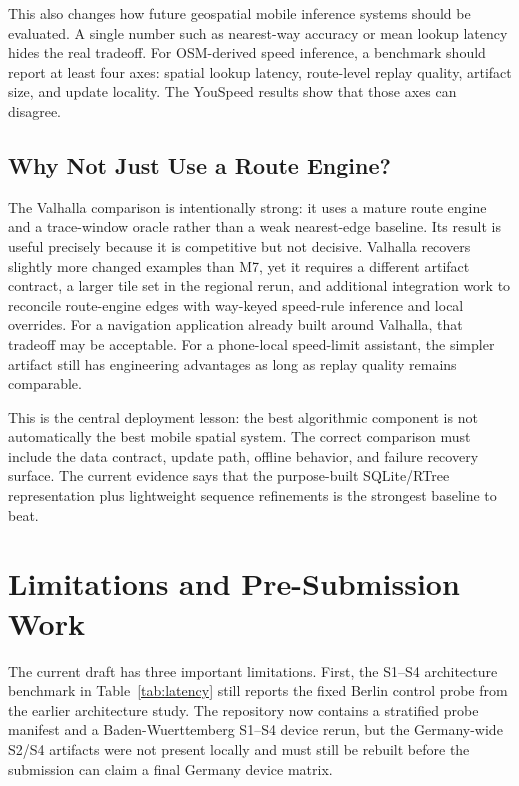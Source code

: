 \documentclass[sigconf]{acmart}
\begin{document}
This also changes how future geospatial mobile inference systems should be evaluated. A single number such as nearest-way accuracy or mean lookup latency hides the real tradeoff. For OSM-derived speed inference, a benchmark should report at least four axes: spatial lookup latency, route-level replay quality, artifact size, and update locality. The YouSpeed results show that those axes can disagree.

\subsection{Why Not Just Use a Route Engine?}

The Valhalla comparison is intentionally strong: it uses a mature route engine and a trace-window oracle rather than a weak nearest-edge baseline. Its result is useful precisely because it is competitive but not decisive. Valhalla recovers slightly more changed examples than M7, yet it requires a different artifact contract, a larger tile set in the regional rerun, and additional integration work to reconcile route-engine edges with way-keyed speed-rule inference and local overrides. For a navigation application already built around Valhalla, that tradeoff may be acceptable. For a phone-local speed-limit assistant, the simpler artifact still has engineering advantages as long as replay quality remains comparable.

This is the central deployment lesson: the best algorithmic component is not automatically the best mobile spatial system. The correct comparison must include the data contract, update path, offline behavior, and failure recovery surface. The current evidence says that the purpose-built SQLite/RTree representation plus lightweight sequence refinements is the strongest baseline to beat.

\section{Limitations and Pre-Submission Work}

The current draft has three important limitations. First, the S1--S4 architecture benchmark in Table~\ref{tab:latency} still reports the fixed Berlin control probe from the earlier architecture study. The repository now contains a stratified probe manifest and a Baden-Wuerttemberg S1--S4 device rerun, but the Germany-wide S2/S4 artifacts were not present locally and must still be rebuilt before the submission can claim a final Germany device matrix.
\end{document}
